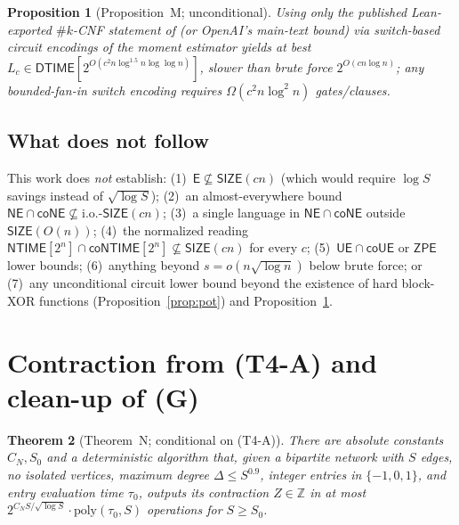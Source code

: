 \documentclass[11pt]{article}
\newtheorem{theorem}{Theorem}
\newtheorem{proposition}[theorem]{Proposition}
\theoremstyle{definition}
\newcommand{\DTIME}{\mathsf{DTIME}}
\newcommand{\NTIME}{\mathsf{NTIME}}
\newcommand{\SIZE}{\mathsf{SIZE}}
\newcommand{\NE}{\mathsf{NE}}
\newcommand{\coNE}{\mathsf{coNE}}
\newcommand{\E}{\mathsf{E}}
\begin{document}
\begin{proposition}[Proposition~M; unconditional]\label{prop:M}
Using only the published Lean-exported $\#k$-CNF statement of \cite{Ant26} (or OpenAI's main-text bound) via switch-based circuit encodings of the moment estimator yields at best $L_c\in\DTIME[2^{O(c^2 n\log^{1.5} n\log\log n)}]$, slower than brute force $2^{O(cn\log n)}$; any bounded-fan-in switch encoding requires $\Omega(c^2 n\log^2 n)$ gates/clauses.
\end{proposition}

\subsection{What does not follow}

This work does \emph{not} establish: (1)~$\E\not\subseteq\SIZE(cn)$ (which would require $\log S$ savings instead of $\sqrt{\log S}$); (2)~an almost-everywhere bound $\NE\cap\coNE\not\subseteq\mathrm{i.o.}\text{-}\SIZE(cn)$; (3)~a single language in $\NE\cap\coNE$ outside $\SIZE(O(n))$; (4)~the normalized reading $\NTIME[2^n]\cap\mathsf{coNTIME}[2^n]\not\subseteq\SIZE(cn)$ for every $c$; (5)~$\mathsf{UE}\cap\mathsf{coUE}$ or $\mathsf{ZPE}$ lower bounds; (6)~anything beyond $s=o(n\sqrt{\log n})$ below brute force; or (7)~any unconditional circuit lower bound beyond the existence of hard block-XOR functions (Proposition~\ref{prop:pot}) and Proposition~\ref{prop:M}.

\section{Contraction from (T4-A) and clean-up of (G)}\label{sec:ext-setup}

\begin{theorem}[Theorem~N; conditional on (T4-A)]\label{thm:N}
There are absolute constants $C_N,S_0$ and a deterministic algorithm that, given a bipartite network with $S$ edges, no isolated vertices, maximum degree $\Delta\le S^{0.9}$, integer entries in $\{-1,0,1\}$, and entry evaluation time $\tau_0$, outputs its contraction $Z\in\mathbb{Z}$ in at most $2^{C_N S/\sqrt{\log S}}\cdot\mathrm{poly}(\tau_0,S)$ operations for $S\ge S_0$.
\end{theorem}
\end{document}
